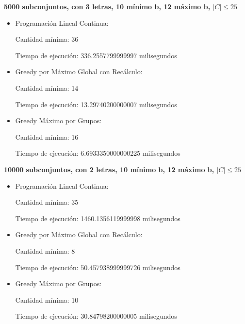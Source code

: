 \textbf{5000 subconjuntos, con 3 letras, 10 mínimo b, 12 máximo b, $|C|\leq 25$}

\begin{itemize}
    \item Programación Lineal Continua:

    Cantidad mínima: 36

    Tiempo de ejecución: 336.2557799999997 milisegundos


    \item Greedy por Máximo Global con Recálculo:

    Cantidad mínima: 14

    Tiempo de ejecución: 13.29740200000007 milisegundos


    \item Greedy Máximo por Grupos:

    Cantidad mínima: 16

    Tiempo de ejecución: 6.6933350000000225 milisegundos

\end{itemize}

\textbf{10000 subconjuntos, con 2 letras, 10 mínimo b, 12 máximo b, $|C|\leq 25$}

\begin{itemize}

    \item    Programación Lineal Continua:
    
    Cantidad mínima: 35

    Tiempo de ejecución: 1460.1356119999998 milisegundos


    \item Greedy por Máximo Global con Recálculo:
    
    Cantidad mínima: 8

    Tiempo de ejecución: 50.457938999999726 milisegundos


    \item Greedy Máximo por Grupos:
    
    Cantidad mínima: 10

    Tiempo de ejecución: 30.84798200000005 milisegundos

\end{itemize}